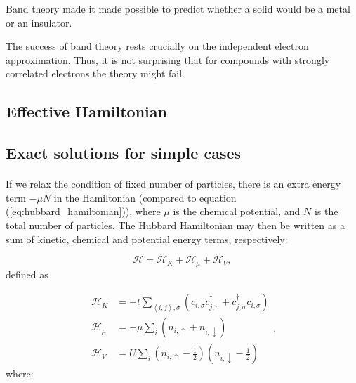 \documentclass[10pt, twocolumn, twoside]{article}
\begin{document}
Band theory made it made possible to predict whether a solid would be a metal or an insulator.

The success of band theory rests crucially on the independent electron approximation. Thus, it is not surprising that for compounds with strongly correlated electrons the theory might fail. 

\subsection{Effective Hamiltonian}\paragraph{}

\subsection{Exact solutions for simple cases}\paragraph{}

If we relax the condition of fixed number of particles, there is an extra energy term $-\mu N$ in the Hamiltonian (compared to equation (\ref{eq:hubbard_hamiltonian})), where $\mu$ is the chemical potential, and $N$ is the total number of particles. The Hubbard Hamiltonian may then be written as a sum of kinetic, chemical and potential energy terms, respectively:

\begin{equation}\label{eq:hubbard}
\mathcal{H} = \mathcal{H}_K + \mathcal{H}_\mu + \mathcal{H}_V ,
\end{equation}
defined as

\begin{equation}\label{eq:def_energies}
\begin{split}
\mathcal{H}_K &= -t \sum_{\left\langle i, j \right \rangle, \sigma} ( c_{i,\sigma} c_{j,\sigma}^\dagger + c_{j,\sigma}^\dagger c_{i,\sigma} ) \\
\mathcal{H}_\mu &= -\mu \sum_i ( n_{i,\uparrow} + n_{i,\downarrow} ) \\
\mathcal{H}_V &= U \sum_{i} ( n_{i,\uparrow} - \frac{1}{2} ) ( n_{i,\downarrow} - \frac{1}{2} )
\end{split} ,
\end{equation}
where:
\end{document}
